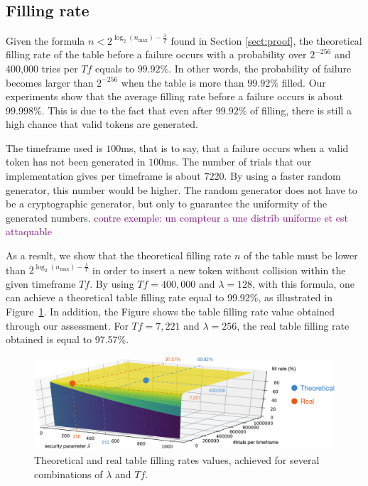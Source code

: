 \documentclass{llncs}
\newcounter{prob}
\newcommand{\ab}[1]{\emph{\bf \color{blue}~[Agathe: #1]}}
\begin{document}
\subsection{Filling rate}

Given the formula $n <2^{\log_2(n_{\max})-\frac{\lambda}{T}}$ found in Section \ref{sect:proof}, the theoretical filling rate of the table before a failure occurs with a probability over $2^{-256}$ and 400,000 tries per $Tf$ equals to $99.92\%$. In other words, the probability of failure becomes larger than $2^{-256}$ when the table is more than $99.92\%$ filled. Our experiments show that the average filling rate before a failure occurs is about $99.998\%$. This is due to the fact that even after $99.92\%$ of filling, there is still a high chance that valid tokens are generated.

The timeframe used is $100$ms, that is to say, that a failure occurs when a valid token has not been generated in $100$ms. The number of trials that our implementation gives per timeframe is about $7220$. By using a faster random generator, this number would be higher. The random generator does not have to be a cryptographic generator, but only to guarantee the uniformity of the generated numbers. \textcolor{purple}{contre exemple: un compteur a une distrib uniforme et est attaquable}

As a result, we show that the theoretical filling rate $n$ of the table must be lower than $2^{\log_2(n_{\max})-\frac{\lambda}{T}}$ in order to insert a new token without collision within the given timeframe $Tf$. By using $Tf = 400,000$ and $\lambda=128$, with this formula, one can achieve a theoretical table filling rate equal to 99.92\%, as illustrated in Figure~\ref{fig:3d-plot}. In addition, the Figure shows the table filling rate value obtained through our assessment. For $Tf=7,221$ and $\lambda=256$, the real table filling rate obtained is equal to 97.57\%.

\begin{figure}
    \centering
    \includegraphics[width=\textwidth]{Tex/Figures/3d_plot}
    \caption{Theoretical and real table filling rates values, achieved for several combinations of $\lambda$ and $Tf$.}
    \label{fig:3d-plot}
\end{figure}
\end{document}
